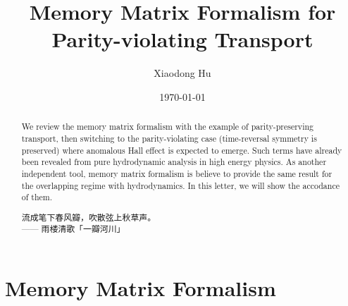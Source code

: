 \documentclass[10pt,nofootinbib,letterpaper]{revtex4}
\begin{document}
\title{Memory Matrix Formalism for Parity-violating Transport}
\author{Xiaodong Hu}

\date{\today}

\begin{abstract}
	We review the memory matrix formalism with the example of parity-preserving transport, then switching to the parity-violating case (time-reversal symmetry is preserved) where anomalous Hall effect is expected to emerge. Such terms have already been revealed from pure hydrodynamic analysis in high energy physics. As another independent tool, memory matrix formalism is believe to provide the same result for the overlapping regime with hydrodynamics. In this letter, we will show the accodance of them.\par
		\hfill\par
		{\centering\kaishu 流成笔下春风瓣，吹散弦上秋草声。\\[0.5em]}
	\hfill------ 雨楼清歌「一瓣河川」
\end{abstract}

\maketitle
\tableofcontents

\section{Memory Matrix Formalism}
\end{document}
